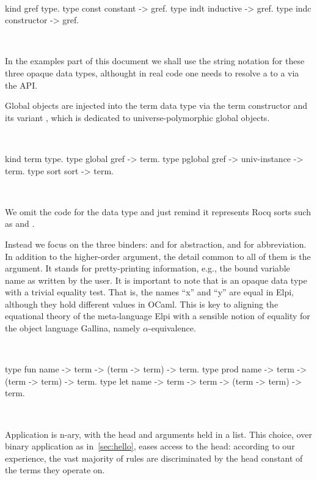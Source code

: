 \documentclass[a4paper, 11pt]{book}
\newenvironment{elpicode}
  {\VerbatimEnvironment~\\\begin{elpibox}\begin{xelpicode}}{\end{xelpicode}
\end{elpibox}\\}
\begin{document}
\begin{elpicode}
kind gref type.
type const constant -> gref.            %
type indt  inductive -> gref.           %
type indc  constructor -> gref.         %
\end{elpicode}

\noindent
In the examples part of this document we shall use the string notation for
these three opaque data types, althought in real code one needs to resolve
a  to a  via the  API.

Global objects are injected into the term data type via the  term
constructor and its variant , which is dedicated to
universe-polymorphic global objects.

\begin{elpicode}
kind term type.
type global  gref -> term.
type pglobal gref -> univ-instance -> term.
type sort    sort -> term.                 %
\end{elpicode}

\noindent
We omit the code for the  data type and just remind it
represents Rocq sorts such as  and .

Instead we focus on the three
binders:  and  for abstraction, and  for
abbreviation. In addition to the higher-order argument, the detail common to
all of them is the  argument. It stands for pretty-printing
information, e.g., the bound variable name as written by the user. It is important
to note that  is an opaque data type with a trivial equality test.
That is, the names ``x'' and ``y'' are equal in Elpi, although they hold
different values in OCaml. This is key to aligning the equational theory of
the meta-language Elpi with a sensible notion of equality for the object
language Gallina, namely $\alpha$-equivalence.

\begin{elpicode}
type fun  name -> term -> (term -> term) -> term.            %
type prod name -> term -> (term -> term) -> term.            %
type let  name -> term -> term -> (term -> term) -> term.    %
\end{elpicode}

\noindent
Application is n-ary, with the head and arguments held in a list. This choice,
over binary application as in~\cref{sec:hello}, eases access to the head:
according to our experience, the vast majority of rules are discriminated by
the head constant of the terms they operate on.
\end{document}
